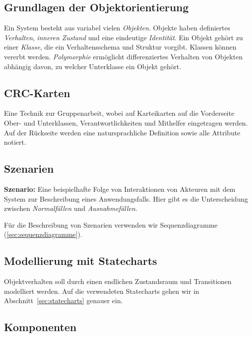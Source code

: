 \documentclass{panikzettel}
\begin{document}

\subsection{Grundlagen der Objektorientierung}

Ein System besteht aus variabel vielen \emph{Objekten}.
Objekte haben definiertes \emph{Verhalten}, \emph{inneren Zustand} und eine eindeutige \emph{Identität}.
Ein Objekt gehört zu einer \emph{Klasse}, die ein Verhaltensschema und Struktur vorgibt.
Klassen können vererbt werden.
\emph{Polymorphie} ermöglicht differenziertes Verhalten von Objekten abhängig davon, zu welcher Unterklasse ein Objekt gehört.

\subsection{CRC-Karten}

Eine Technik zur Gruppenarbeit, wobei auf Karteikarten auf die Vorderseite Ober- und Unterklassen, Verantwortlichkeiten und Mithelfer eingetragen werden.
Auf der Rückseite werden eine natursprachliche Definition sowie alle Attribute notiert.

\subsection{Szenarien}

\textbf{Szenario:} Eine beispielhafte Folge von Interaktionen von Akteuren mit dem System zur Beschreibung eines Anwendungsfalls.
Hier gibt es die Unterscheidung zwischen \emph{Normalfällen} und \emph{Ausnahmefällen}.

Für die Beschreibung von Szenarien verwenden wir Sequenzdiagramme (\ref{sec:sequenzdiagramme}).

\subsection{Modellierung mit Statecharts}

Objektverhalten soll durch einen endlichen Zustandsraum und Transitionen modelliert werden.
Auf die verwendeten Statecharts gehen wir in Abschnitt~\ref{sec:statecharts} genauer ein.

\subsection{Komponenten}
\end{document}
